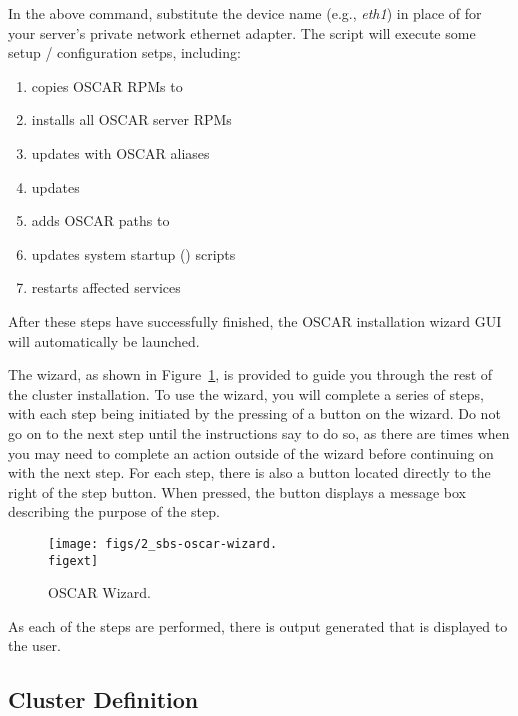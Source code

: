 In the above command, substitute the device name (e.g., \emph{eth1})
in place of  for your server's private network
ethernet adapter.  The script will execute some setup / configuration
setps, including:

\begin{enumerate}
\item copies OSCAR RPMs to 
\item installs all OSCAR server RPMs
\item updates  with OSCAR aliases
\item updates  
\item adds OSCAR paths to  
\item updates system startup () scripts
\item restarts affected services
\end{enumerate}

After these steps have successfully finished, the OSCAR installation
wizard GUI will automatically be launched.
  
The wizard, as shown in Figure~\ref{fig:detailed-oscar-wizard}, is
provided to guide you through the rest of the cluster installation.
To use the wizard, you will complete a series of steps, with each step
being initiated by the pressing of a button on the wizard. Do not go
on to the next step until the instructions say to do so, as there are
times when you may need to complete an action outside of the wizard
before continuing on with the next step. For each step, there is also
a  button located directly to the right of the step
button.  When pressed, the  button displays a message box
describing the purpose of the step.

\begin{figure}[htbp]
  \begin{center}
    \texttt{[image: figs/2\_sbs-oscar-wizard.\\figext]}
    \caption{OSCAR Wizard.}
    \label{fig:detailed-oscar-wizard}
  \end{center}
\end{figure}
  
As each of the steps are performed, there is output generated that is
displayed to the user. 


\subsection{Cluster Definition}
\label{sec:detailed-cluster-def}

